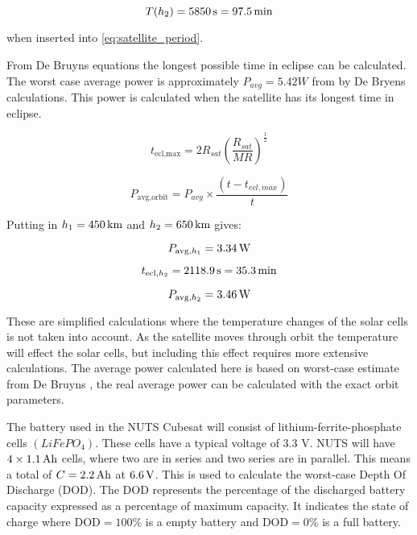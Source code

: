 \begin{equation}
T(h_2) = \unit[5850]{s} = \unit[97.5]{min}
\end{equation}

when inserted into \autoref{eq:satellite_period}.

From De Bruyns equations \cite{Satellite Power Systems} the longest possible time in eclipse can be calculated. The worst case average power is approximately $P_{avg} = 5.42 W$ from by De Bryens calculations. This power is calculated when the satellite has its longest time in eclipse.

\begin{equation}
	t_{\text{ecl,max}} = 2R_{sat}\left(\frac{R_{sat}}{MR}\right)^{\frac{1}{2}}
	\label{Maximum time in eclipse}
\end{equation}

\begin{equation}
	P_{\text{avg,orbit}} = P_{avg}\times\frac{(t-t_{ecl,max})}{t}
	\label{Average effect during one orbit}
\end{equation}

Putting in $h_1 =\unit[450]{km}$ and $h_2 = \unit[650]{km}$ gives:


\begin{equation}
P_{\text{avg},h_1} = \unit[3.34]{W}
\end{equation}

\begin{equation}
t_{\text{ecl},h_2} = \unit[2118.9]{s} = \unit[35.3]{min}
\end{equation}

\begin{equation}
P_{\text{avg},h_2} = \unit[3.46]{W}
\end{equation}

These are simplified calculations where the temperature changes of the solar cells is not taken into account. As the satellite moves through orbit the temperature will effect the solar cells, but including this effect requires more extensive calculations. The average power calculated here is based on worst-case estimate from De Bruyns \cite{Satellite Power Systems}, the real average power can be calculated with the exact orbit parameters. 

The battery used in the NUTS Cubesat will consist of lithium-ferrite-phosphate cells $(LiFePO_4)$\cite{Overview of NUTS}. 
These cells have a typical voltage of 3.3 V. NUTS will have $4\times \unit[1.1]{Ah}$ cells, where two are in series and two series are in parallel. This means a total of $C=\unit[2.2]{Ah}$ at $\unit[6.6]{V}$\cite{Satellite Power Systems}. This is used to calculate the worst-case Depth Of Discharge (DOD). The DOD represents the percentage of the discharged battery capacity expressed as a percentage of maximum capacity. It indicates the state of charge where $\text{DOD} = 100\% $ is a empty battery and $\text{DOD}=0\%$ is a full battery.

